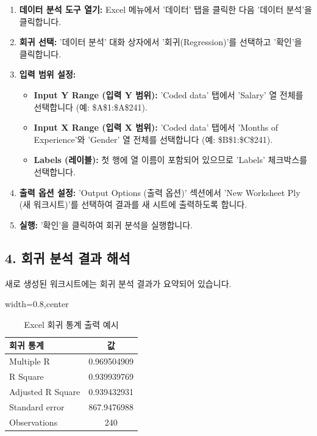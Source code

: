 \documentclass[11pt,a4paper]{book}
\theoremstyle{definition}
\begin{document}
\begin{enumerate}
    \item \textbf{데이터 분석 도구 열기:} Excel 메뉴에서 '데이터' 탭을 클릭한 다음 '데이터 분석'을 클릭합니다.
    \item \textbf{회귀 선택:} '데이터 분석' 대화 상자에서 '회귀(Regression)'를 선택하고 '확인'을 클릭합니다.
    \item \textbf{입력 범위 설정:}
    \begin{itemize}
        \item \textbf{Input Y Range (입력 Y 범위):} 'Coded data' 탭에서 'Salary' 열 전체를 선택합니다 (예: \$A\$1:\$A\$241).
        \item \textbf{Input X Range (입력 X 범위):} 'Coded data' 탭에서 'Months of Experience'와 'Gender' 열 전체를 선택합니다 (예: \$B\$1:\$C\$241).
        \item \textbf{Labels (레이블):} 첫 행에 열 이름이 포함되어 있으므로 'Labels' 체크박스를 선택합니다.
    \end{itemize}
    \item \textbf{출력 옵션 설정:} 'Output Options (출력 옵션)' 섹션에서 'New Worksheet Ply (새 워크시트)'를 선택하여 결과를 새 시트에 출력하도록 합니다.
    \item \textbf{실행:} '확인'을 클릭하여 회귀 분석을 실행합니다.
\end{enumerate}

\subsection{4. 회귀 분석 결과 해석}
새로 생성된 워크시트에는 회귀 분석 결과가 요약되어 있습니다.

\begin{table}[htbp]
\centering
\caption{Excel 회귀 통계 출력 예시}
\label{tab:excel_reg_stats}
\begin{adjustbox}{width=0.8\textwidth,center}
\begin{tabular}{lc}
\toprule
\textbf{회귀 통계} & \textbf{값} \\
\midrule
Multiple R & 0.969504909 \\
R Square & 0.939939769 \\
Adjusted R Square & 0.939432931 \\
Standard error & 867.9476988 \\
Observations & 240 \\
\bottomrule
\end{tabular}
\end{adjustbox}
\end{table}
\end{document}
